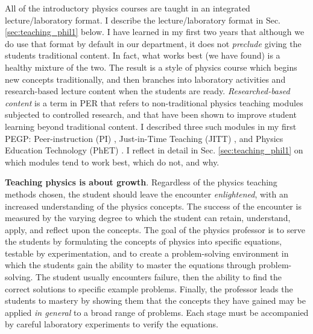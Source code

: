 \documentclass[../../main.tex]{subfiles}
\begin{document}
All of the introductory physics courses are taught in an integrated lecture/laboratory format.  I describe the lecture/laboratory format in Sec. \ref{sec:teaching_phil1} below.  I have learned in my first two years that although we do use that format by default in our department, it does not \textit{preclude} giving the students traditional content.  In fact, what works best (we have found) is a healthy mixture of the two.  The result is a style of physics course which begins new concepts traditionally, and then branches into laboratory activities and research-based lecture content when the students are ready.  \textit{Researched-based content} is a term in PER that refers to non-traditional physics teaching modules subjected to controlled research, and that have been shown to improve student learning beyond traditional content.  I described three such modules in my first PEGP: Peer-instruction (PI) \cite{mazur2013peer}, Just-in-Time Teaching (JITT) \cite{jitt}, and Physics Education Technology (PhET) \cite{phet}.  I reflect in detail in Sec. \ref{sec:teaching_phil1} on which modules tend to work best, which do not, and why. \\ \hspace{0.1cm}

\textbf{Teaching physics is about growth}.  Regardless of the physics teaching methods chosen, the student should leave the encounter \textit{enlightened}, with an increased understanding of the physics concepts.  The success of the encounter is measured by the varying degree to which the student can retain, understand, apply, and reflect upon the concepts.  The goal of the physics professor is to serve the students by formulating the concepts of physics into specific equations, testable by experimentation, and to create a problem-solving environment in which the students gain the ability to master the equations through problem-solving.  The student usually encounters failure, then the ability to find the correct solutions to specific example problems.  Finally, the professor leads the students to mastery by showing them that the concepts they have gained may be applied \textit{in general} to a broad range of problems. Each stage must be accompanied by careful laboratory experiments to verify the equations. \\ \hspace{0.1cm}
\end{document}
